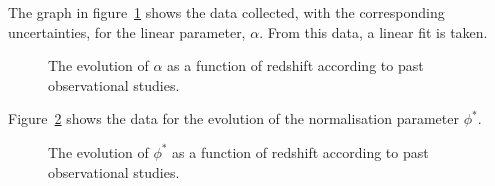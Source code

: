             The graph in figure~\ref{fig:alpha_evolution} shows the data collected, with the corresponding uncertainties, for the linear parameter, $\alpha$. From this data, a linear fit is taken.
            \begin{figure}[ht]
                \begin{center}
                    \begingroup{}
                    \resizebox{0.7\textwidth}{!}{%
                        
                    }\endgroup
                    \caption{The evolution of $\alpha$ as a function of redshift according to past observational studies.\label{fig:alpha_evolution}}
                \end{center}
            \end{figure}

            Figure~\ref{fig:phi_evolution} shows the data for the evolution of the normalisation parameter $\phi^{*}$.
            \begin{figure}[ht]
                \begin{center}
                    \begingroup{}
                    \resizebox{0.7\textwidth}{!}{%
                        
                    }\endgroup
                    \caption{The evolution of $\phi^{*}$ as a function of redshift according to past observational studies.\label{fig:phi_evolution}}
                \end{center}
            \end{figure}

